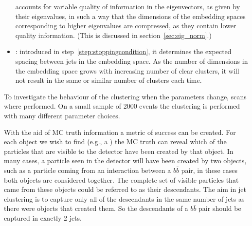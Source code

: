 \begin{itemize}
          accounts for variable quality of information in the eigenvectors, as given by their eigenvalues,
        in such a way that the dimensions of the embedding spaces 
        corresponding to higher eigenvalues are compressed,
        as they contain lower quality information.
        (This is discussed in section~\ref{sec:eig_norm}.)
    \item \stoppingdeltar{}:  introduced in step~\ref{step:stoppingcondition}, it
         determines the expected spacing between jets in the embedding space.
         As the number of dimensions in the embedding space grows with increasing 
         number of clear clusters, it will not result in the same or
         similar number of clusters each time.

\end{itemize}


To investigate the behaviour of the clustering when the parameters change, scans where performed.
On a small sample of 2000 events  the clustering is performed with many different parameter choices.

With the aid of MC truth information a metric of success can be created.
For each object we wish to find (e.g., a ) 
the MC truth can reveal which of the particles that are visible to the detector have
been created by that object.
In many cases, a particle seen in the detector will have been created by two objects,
such as a particle coming from an interaction between a \(b\bar{b}\) pair,
in these cases both objects are considered together.
The complete set of visible particles that came from these objects could be referred to as their descendants.
The aim in jet clustering is to capture only all of the descendants in the same number of jets as there were objects that created them.
So the descendants of a \(b\bar{b}\) pair should be captured in exactly 2 jets.

